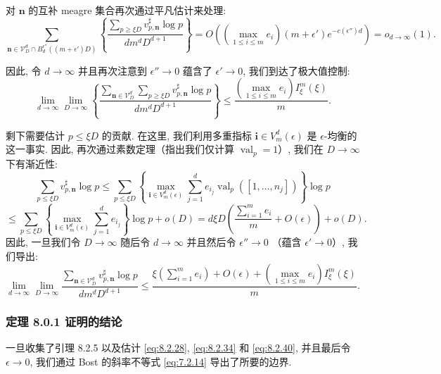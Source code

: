 对 \(\mathbf{n}\) 的互补 meagre 集合再次通过平凡估计来处理:
\begin{equation}\label{eq:8.2.38}
\sum_{\mathbf{n}\in\mathcal{V}_D^d\cap B_d^{\epsilon''}((m+\epsilon')D)} \left\{ \frac{\sum_{p\geq\xi D} v_{p,\mathbf{n}}^\sharp \log p}{dm^d D^{d+1}} \right\} = O\left( \left( \max_{1\leq i\leq m} e_i \right) (m+\epsilon') e^{-c(\epsilon'')d} \right) = o_{d\to\infty}(1).
\end{equation}

因此, 令 \(d \to \infty\) 并且再次注意到 \(\epsilon'' \to 0\) 蕴含了 \(\epsilon' \to 0\), 
我们到达了极大值控制:
\begin{equation}\label{eq:8.2.39}
\lim_{d \to \infty} \lim_{D \to \infty} \left\{ \frac{\sum_{\mathbf{n} \in \mathcal{V}_D^d} \sum_{p \ge \xi D} v_{p, \mathbf{n}}^{\sharp} \log p}{dm^d D^{d+1}} \right\} \le \frac{\left(\max_{1 \le i \le m} e_i\right) I_{\xi}^m(\xi)}{m}.
\end{equation}

剩下需要估计 \(p \leq \xi D\) 的贡献. 
在这里, 我们利用多重指标 \(\mathbf{i} \in V_m^d(\epsilon)\) 是 \(\epsilon\)-均衡的这一事实. 
因此, 再次通过素数定理（指出我们仅计算 \(\operatorname{val}_p = 1\)）, 我们在 \(D \to \infty\) 下有渐近性:
\[ \sum_{p \le \xi D} v_{p,\mathbf{n}}^{\sharp} \log p \le \sum_{p \le \xi D} \left\{ \max_{\mathbf{i} \in V_m^d(\epsilon)} \sum_{j=1}^d e_{i_j} \operatorname{val}_p([1, \dots, n_j]) \right\} \log p \]
\[ \le \sum_{p \le \xi D} \left\{ \max_{\mathbf{i} \in V_m^d(\epsilon)} \sum_{j=1}^d e_{i_j} \right\} \log p + o(D) = d\xi D \left( \frac{\sum_{i=1}^m e_i}{m} + O(\epsilon) \right) + o(D). \]
因此, 一旦我们令 \(D \to \infty\) 随后令 \(d \to \infty\) 并且然后令 \(\epsilon'' \to 0\) （蕴含 \(\epsilon' \to 0\)）, 
我们导出:
\begin{equation}\label{eq:8.2.40}
\lim_{d\to\infty}\lim_{D\to\infty}\frac{\sum_{\mathbf{n}\in\mathcal{V}_D^d}v_{p,\mathbf{n}}^\sharp\log p}{dm^dD^{d+1}}\leq \frac{\xi(\sum_{i=1}^me_i)+O(\epsilon)+(\max_{1\leq i\leq m}e_i)I_\xi^m(\xi)}{m}.
\end{equation}

\subsubsection{定理 8.0.1 证明的结论}\label{sec:8.2.41}

一旦收集了引理 8.2.5 以及估计 \eqref{eq:8.2.28}, \eqref{eq:8.2.34} 和 \eqref{eq:8.2.40}, 
并且最后令 \(\epsilon \to 0\), 我们通过 Bost 的斜率不等式 \eqref{eq:7.2.14} 导出了所要的边界.

